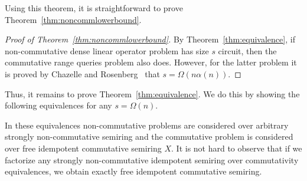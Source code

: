 \documentclass[11pt,letterpaper]{article}
\begin{document}
Using this theorem, it is straightforward to prove
Theorem~\ref{thm:noncommlowerbound}.

\begin{proof}[Proof of Theorem~\ref{thm:noncommlowerbound}]
By Theorem~\ref{thm:equivalence}, if non-commutative dense linear operator problem has size $s$ circuit, then the commutative range queries problem also does. However, for the latter problem it is proved by Chazelle and Rosenberg~\cite{DBLP:journals/ijcga/ChazelleR91} that $s=\Omega(n \alpha(n))$.
\end{proof}

Thus, it remains to prove Theorem~\ref{thm:equivalence}. We do this by showing the following equivalences for any $s = \Omega(n)$.

\begin{center}
\end{center}

In these equivalences non-commutative problems are considered over arbitrary strongly non-commutative semiring and the commutative problem is considered over free idempotent commutative semiring $X$. It is not hard to observe that if we factorize any strongly non-commutative idempotent semiring over commutativity equivalences, we obtain exactly free idempotent commutative semiring.




%
%
\end{document}
